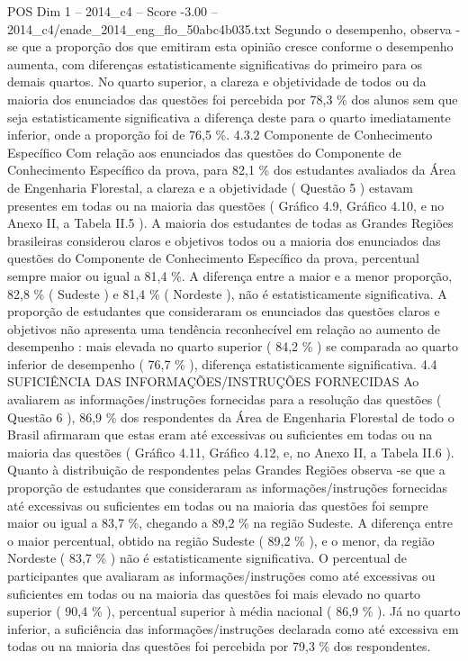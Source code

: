 \begin{textsample}{POS Dim 1 – 2014\_c4 – Score -3.00 – 2014\_c4/enade\_2014\_eng\_flo\_50abc4b035.txt}
Segundo o desempenho, observa -se que a proporção dos que emitiram esta opinião cresce conforme o desempenho aumenta, com diferenças estatisticamente significativas do primeiro para os demais quartos.
No quarto superior, a clareza e objetividade de todos ou da maioria dos enunciados das questões foi percebida por 78,3 \% dos alunos sem que seja estatisticamente significativa a diferença deste para o quarto imediatamente inferior, onde a proporção foi de 76,5 \%. 4.3.2 Componente de Conhecimento Específico Com relação aos enunciados das questões do Componente de Conhecimento Específico da prova, para 82,1 \% dos estudantes avaliados da Área de Engenharia Florestal, a clareza e a objetividade ( Questão 5 ) estavam presentes em todas ou na maioria das questões ( Gráfico 4.9, Gráfico 4.10, e no Anexo II, a Tabela II.5 ).
A maioria dos estudantes de todas as Grandes Regiões brasileiras considerou claros e objetivos todos ou a maioria dos enunciados das questões do Componente de Conhecimento Específico da prova, percentual sempre maior ou igual a 81,4 \%.
A diferença entre a maior e a menor proporção, 82,8 \% ( Sudeste ) e 81,4 \% ( Nordeste ), não é estatisticamente significativa.
A proporção de estudantes que consideraram os enunciados das questões claros e objetivos não apresenta uma tendência reconhecível em relação ao aumento de desempenho : mais elevada no quarto superior ( 84,2 \% ) se comparada ao quarto inferior de desempenho ( 76,7 \% ), diferença estatisticamente significativa. 4.4 SUFICIÊNCIA DAS INFORMAÇÕES/INSTRUÇÕES FORNECIDAS Ao avaliarem as informações/instruções fornecidas para a resolução das questões ( Questão 6 ), 86,9 \% dos respondentes da Área de Engenharia Florestal de todo o Brasil afirmaram que estas eram até excessivas ou suficientes em todas ou na maioria das questões ( Gráfico 4.11, Gráfico 4.12, e, no Anexo II, a Tabela II.6 ).
Quanto à distribuição de respondentes pelas Grandes Regiões observa -se que a proporção de estudantes que consideraram as informações/instruções fornecidas até excessivas ou suficientes em todas ou na maioria das questões foi sempre maior ou igual a 83,7 \%, chegando a 89,2 \% na região Sudeste.
A diferença entre o maior percentual, obtido na região Sudeste ( 89,2 \% ), e o menor, da região Nordeste ( 83,7 \% ) não é estatisticamente significativa.
O percentual de participantes que avaliaram as informações/instruções como até excessivas ou suficientes em todas ou na maioria das questões foi mais elevado no quarto superior ( 90,4 \% ), percentual superior à média nacional ( 86,9 \% ).
Já no quarto inferior, a suficiência das informações/instruções declarada como até excessiva em todas ou na maioria das questões foi percebida por 79,3 \% dos respondentes.

\end{textsample}

